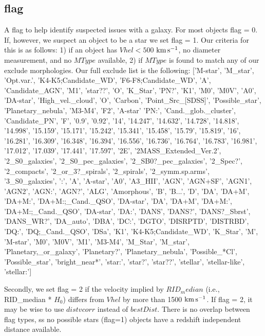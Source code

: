 \documentclass[iop]{emulateapj-rtx4}
\newcommand{\kms}{$\rm km\, s^{-1}$}
\begin{document}
\subsection{flag}
A flag to help identify suspected issues with a galaxy. For most objects flag = 0. If, however, we suspect an object to be a star we set flag = 1. Our criteria for this is as follows: 1) if an object has $Vhel < 500$ \kms, no diameter measurement, and no $MType$ available, 2) if $MType$ is found to match any of our exclude morphologies. Our full exclude list is the following: ['M-star', 'M\_star', 'Opt.var.', 'K4-K5;Candidate\_WD', 'F6-F8;Candidate\_WD', 'A', 'Candidate\_AGN', 'M1', 'star??', 'O', 'K\_Star', 'PN?', 'K1', 'M0', 'M0V', 'A0', 'DA-star', 'High\_vel.\_cloud', 'O', 'Carbon', 'Point\_Src\_[SDSS]', 'Possible\_star', 'Planetary\_nebula', 'M3-M4', 'F2', 'A-star' 'PN:', 'Cand.\_glob.\_cluster', 'Candidate\_PN', 'F', '0.9', '0.92', '14', '14.247', '14.632', '14.728', '14.818', '14.998', '15.159', '15.171', '15.242', '15.341', '15.458', '15.79', '15.819', '16', '16.281', '16.309', '16.348', '16.394', '16.556', '16.736', '16.764', '16.783', '16.981', '17.012', '17.039', '17.441', '17.597', '2E', '2MASS\_Extended\_Ver.2', '2\_S0\_galaxies', '2\_S0\_pec\_galaxies', '2\_SB0?\_pec\_galaxies', '2\_Spec?', '2\_compacts', '2\_or\_3?\_spirals', '2\_spirals', '2\_symm.sp.arms', '3\_S0\_galaxies', ':', 'A', 'A-star', 'A0', 'A3\_HII', 'AGN', 'AGN+SF', 'AGN1', 'AGN2', 'AGN:', 'AGN?', 'ALG', 'Amorphous', 'B', 'B...', 'D', 'DA', 'DA+M', 'DA+M:', 'DA+M:;\_Cand.\_QSO', 'DA-star', 'DA', 'DA+M', 'DA+M:', 'DA+M:;\_Cand.\_QSO', 'DA-star', 'DA:', 'DANS', 'DANS?', 'DANS?\_Sbrst', 'DANS\_WR?', 'DA\_auto', 'DBA', 'DC:', 'DGTO', 'DISRPTD', 'DISTRBD', 'DQ:', 'DQ;\_Cand.\_QSO', 'DSa', 'K1', 'K4-K5;Candidate\_WD', 'K\_Star', 'M', 'M-star', 'M0', 'M0V', 'M1', 'M3-M4', 'M\_Star', 'M\_star', 'Planetary,\_or\_galaxy', 'Planetary?', 'Planetary\_nebula', 'Possible\_*Cl', 'Possible\_star', 'bright\_near*', 'star:', 'star?', 'star??', 'stellar', 'stellar-like', 'stellar:']




Secondly, we set flag = 2 if the velocity implied by $RID_median$ (i.e., RID\_median * $H_0$) differs from $Vhel$ by more than 1500 \kms. If flag = 2, it may be wise to use $distvcorr$ instead of $bestDist$. There is no overlap between flag types, ss no possible stars (flag=1) objects have a redshift independent distance available.
\end{document}
